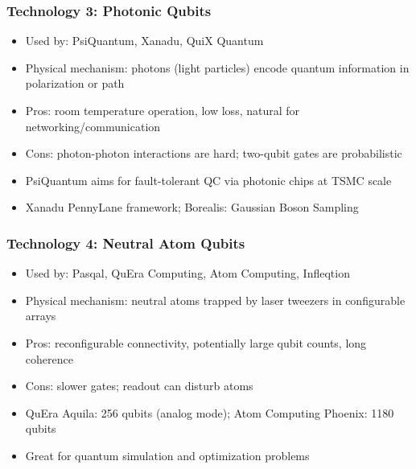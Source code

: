 \begin{frame}[fragile]\frametitle{Technology 3: Photonic Qubits}
\begin{itemize}
\item Used by: PsiQuantum, Xanadu, QuiX Quantum
\item Physical mechanism: photons (light particles) encode quantum information in polarization or path
\item Pros: room temperature operation, low loss, natural for networking/communication
\item Cons: photon-photon interactions are hard; two-qubit gates are probabilistic
\item PsiQuantum aims for fault-tolerant QC via photonic chips at TSMC scale
\item Xanadu PennyLane framework; Borealis: Gaussian Boson Sampling
\end{itemize}
\end{frame}

\begin{frame}[fragile]\frametitle{Technology 4: Neutral Atom Qubits}
\begin{itemize}
\item Used by: Pasqal, QuEra Computing, Atom Computing, Infleqtion
\item Physical mechanism: neutral atoms trapped by laser tweezers in configurable arrays
\item Pros: reconfigurable connectivity, potentially large qubit counts, long coherence
\item Cons: slower gates; readout can disturb atoms
\item QuEra Aquila: 256 qubits (analog mode); Atom Computing Phoenix: 1180 qubits
\item Great for quantum simulation and optimization problems
\end{itemize}
\end{frame}

